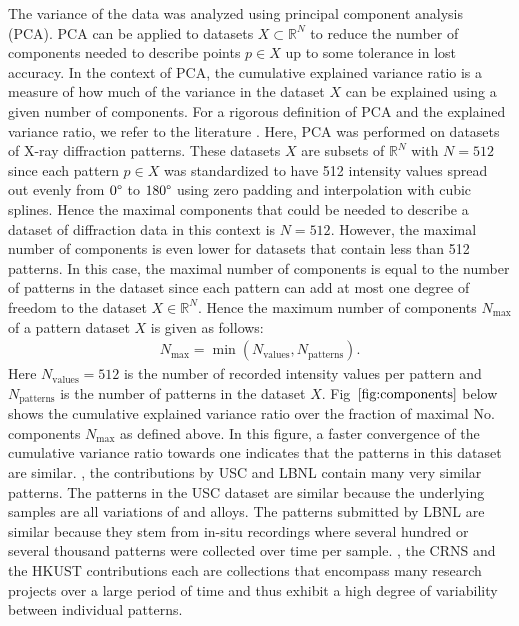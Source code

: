 The variance of the data was analyzed using principal component analysis (PCA). PCA can be applied to datasets $X \subset \mathbb{R}^N$ to reduce the number of components needed to describe points $p \in X$ up to some tolerance in lost accuracy. In the context of PCA, the cumulative explained variance ratio is a measure of how much of the variance in the dataset $X$ can be explained using a given number of components. For a rigorous definition of PCA and the explained variance ratio, we refer to the literature \cite{Jolliffe2016}. Here, PCA was performed on datasets of X-ray diffraction patterns. These datasets $X$ are subsets of $\mathbb{R}^{N}$ with $N=512$ since each pattern $p \in X$ was standardized to have 512 intensity values spread out evenly from $0\degree$ to $180\degree$ using zero padding and interpolation with cubic splines. Hence the maximal components that could be needed to describe a dataset of diffraction data in this context is $N=512$. However, the maximal number of components is even lower for datasets that contain less than 512 patterns. In this case, the maximal number of components is equal to the number of patterns in the dataset since each pattern can add at most one degree of freedom to the dataset $X \in \mathbb{R}^N$. Hence the maximum number of components $N_{\text{max}}$ of a pattern dataset $X$ is given as follows:
\begin{align}
    N_{\text{max}} = \min(N_{\text{values}}, N_{\text{patterns}}).
      \label{eq:nmax}
\end{align}
Here $N_{\text{values}} =512$ is the number of recorded intensity values per pattern and $N_{\text{patterns}}$ is the number of patterns in the dataset $X$. Fig~$\eqref{fig:components}$ below shows the cumulative explained variance ratio over the fraction of maximal No. components $N_{\text{max}}$ as defined above. In this figure, a faster convergence of the cumulative variance ratio towards one indicates that the patterns in this dataset are  similar.  , the contributions by USC and LBNL contain many very similar patterns. The patterns in the USC dataset are similar because the underlying samples are all variations of  and  alloys. The patterns submitted by LBNL are similar because they stem from in-situ recordings where several hundred or several thousand patterns were collected over time per sample.  , the CRNS and the HKUST contributions each are collections that encompass many research projects over a large period of time and thus exhibit a high degree of variability between individual patterns. 

